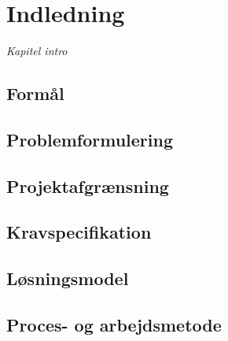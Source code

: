 \chapter{Indledning}
\vspace*{0.5 cm}
\emph{Kapitel intro}

\section{Formål}

\section{Problemformulering}

\section{Projektafgrænsning}

\section{Kravspecifikation} 

\section{Løsningsmodel}

\section{Proces- og arbejdsmetode}
